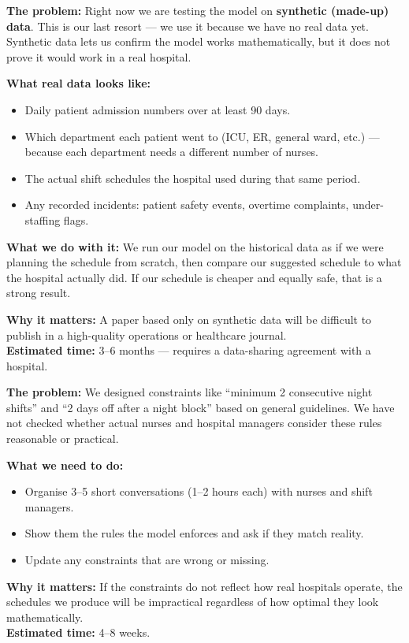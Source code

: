 \documentclass[12pt,a4paper]{article}
\begin{document}
\vspace{6pt}
\begin{warnbox}
\textbf{The problem:} Right now we are testing the model on \textbf{synthetic (made-up) data}. This is our last resort — we use it because we have no real data yet. Synthetic data lets us confirm the model works mathematically, but it does not prove it would work in a real hospital.

\textbf{What real data looks like:}
\begin{itemize}[itemsep=2pt]
  \item Daily patient admission numbers over at least 90 days.
  \item Which department each patient went to (ICU, ER, general ward, etc.) — because each department needs a different number of nurses.
  \item The actual shift schedules the hospital used during that same period.
  \item Any recorded incidents: patient safety events, overtime complaints, under-staffing flags.
\end{itemize}

\textbf{What we do with it:} We run our model on the historical data as if we were planning the schedule from scratch, then compare our suggested schedule to what the hospital actually did. If our schedule is cheaper and equally safe, that is a strong result.

\textbf{Why it matters:} A paper based only on synthetic data will be difficult to publish in a high-quality operations or healthcare journal.\\
\textbf{Estimated time:} 3–6 months — requires a data-sharing agreement with a hospital.
\end{warnbox}

\vspace{6pt}
\begin{warnbox}
\textbf{The problem:} We designed constraints like ``minimum 2 consecutive night shifts'' and ``2 days off after a night block'' based on general guidelines. We have not checked whether actual nurses and hospital managers consider these rules reasonable or practical.

\textbf{What we need to do:}
\begin{itemize}[itemsep=2pt]
  \item Organise 3–5 short conversations (1–2 hours each) with nurses and shift managers.
  \item Show them the rules the model enforces and ask if they match reality.
  \item Update any constraints that are wrong or missing.
\end{itemize}

\textbf{Why it matters:} If the constraints do not reflect how real hospitals operate, the schedules we produce will be impractical regardless of how optimal they look mathematically.\\
\textbf{Estimated time:} 4–8 weeks.
\end{warnbox}
\end{document}
